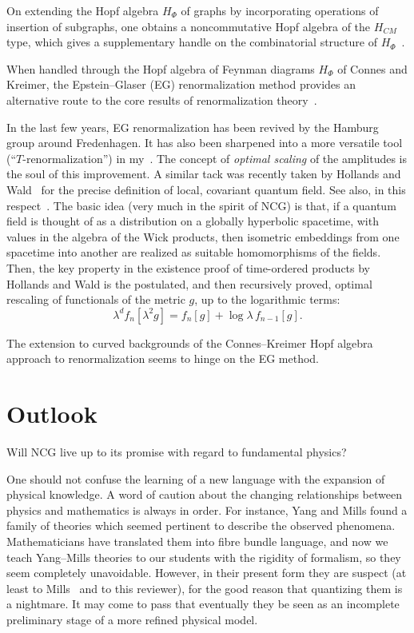 \documentclass[a4paper,12pt]{article}
\newcommand{\la}{\lambda}           %
\newcommand{\1}{\mathbf{1}}         %
\newcommand{\7}{\dagger}            %
\newcommand{\8}{\bullet}            %
\renewcommand{\.}{\cdot}            %
\renewcommand{\:}{\colon}           %
\begin{document}
On extending the Hopf algebra $H_\Phi$ of
graphs by incorporating operations of insertion of subgraphs, one
obtains a noncommutative Hopf algebra of the $H_{CM}$ type, which
gives a supplementary handle on the combinatorial structure of
$H_\Phi$~\cite{ConnesKrLie}.

\smallskip
When handled through the Hopf algebra of Feynman
diagrams $H_\Phi$ of Connes and Kreimer, the Epstein--Glaser (EG)
renormalization method provides an alternative route to the core
results of renormalization theory~\cite{PinterSmat,PinterHopf}.

In the last few years, EG renormalization has been revived by the
Hamburg group around Fredenhagen. It has also been sharpened into a
more versatile tool (``$T$-renormali\-za\-tion'') in my~\cite{Carme}.
The concept of \textit{optimal scaling} of the amplitudes is the soul
of this improvement. A similar tack was recently taken by Hollands and
Wald~\cite{HollandsW} for the precise definition of local, covariant
quantum field. See also, in this
respect~\cite{BrunettiFV,JunkerS,Grigore}. The basic idea (very much
in the spirit of NCG) is that, if a quantum field is thought of as a
distribution on a globally hyperbolic spacetime, with values in the
algebra of the Wick products, then isometric embeddings from one
spacetime into another are realized as suitable homomorphisms of the
fields. Then, the key property in the existence proof of time-ordered
products by Hollands and Wald is the postulated, and then recursively
proved, optimal rescaling of functionals of the metric $g$, up to the
logarithmic terms:
$$
\la^d f_n[\la^2 g] = f_n[g] + \log\la \,f_{n-1}[g].
$$

The extension to curved backgrounds of the Connes--Kreimer Hopf
algebra approach to renormalization seems to hinge on the EG method.



\section{Outlook}

Will NCG live up to its promise with regard to fundamental physics? 

One should not confuse the learning of a new language with the
expansion of physical knowledge. A word of caution about the changing
relationships between physics and mathematics is always in order. For
instance, Yang and Mills found a family of theories which seemed
pertinent to describe the observed phenomena. Mathematicians have
translated them into fibre bundle language, and now we teach
Yang--Mills theories to our students with the rigidity of formalism,
so they seem completely unavoidable. However, in their present form
they are suspect (at least to Mills~\cite{Mills} and to this
reviewer), for the good reason that quantizing them is a nightmare. It
may come to pass that eventually they be seen as an incomplete
preliminary stage of a more refined physical model.
\end{document}
